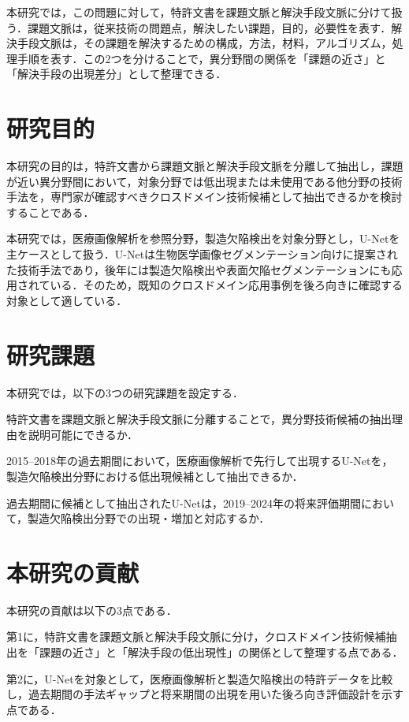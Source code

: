 本研究では，この問題に対して，特許文書を課題文脈と解決手段文脈に分けて扱う．課題文脈は，従来技術の問題点，解決したい課題，目的，必要性を表す．解決手段文脈は，その課題を解決するための構成，方法，材料，アルゴリズム，処理手順を表す．この2つを分けることで，異分野間の関係を「課題の近さ」と「解決手段の出現差分」として整理できる．

\section{研究目的}
本研究の目的は，特許文書から課題文脈と解決手段文脈を分離して抽出し，課題が近い異分野間において，対象分野では低出現または未使用である他分野の技術手法を，専門家が確認すべきクロスドメイン技術候補として抽出できるかを検討することである．

本研究では，医療画像解析を参照分野，製造欠陥検出を対象分野とし，U-Netを主ケースとして扱う．U-Netは生物医学画像セグメンテーション向けに提案された技術手法であり\cite{ronneberger2015unet}，後年には製造欠陥検出や表面欠陥セグメンテーションにも応用されている．そのため，既知のクロスドメイン応用事例を後ろ向きに確認する対象として適している．

\section{研究課題}
本研究では，以下の3つの研究課題を設定する．

\begin{description}[leftmargin=3.0em]
  \item[RQ1] 特許文書を課題文脈と解決手段文脈に分離することで，異分野技術候補の抽出理由を説明可能にできるか．
  \item[RQ2] 2015--2018年の過去期間において，医療画像解析で先行して出現するU-Netを，製造欠陥検出分野における低出現候補として抽出できるか．
  \item[RQ3] 過去期間に候補として抽出されたU-Netは，2019--2024年の将来評価期間において，製造欠陥検出分野での出現・増加と対応するか．
\end{description}

\section{本研究の貢献}
本研究の貢献は以下の3点である．

第1に，特許文書を課題文脈と解決手段文脈に分け，クロスドメイン技術候補抽出を「課題の近さ」と「解決手段の低出現性」の関係として整理する点である．

第2に，U-Netを対象として，医療画像解析と製造欠陥検出の特許データを比較し，過去期間の手法ギャップと将来期間の出現を用いた後ろ向き評価設計を示す点である．

